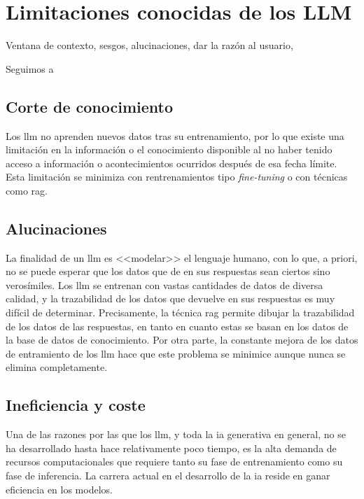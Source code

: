 \section{Limitaciones conocidas de los LLM}
\label{sec:limitaciones_llm}
Ventana de contexto, sesgos, alucinaciones, dar la razón al usuario, 

Seguimos a \cite{arunbijiRAGVsFinetuning}



\subsection{Corte de conocimiento}

Los \gls{llm} no aprenden nuevos datos tras su entrenamiento, por lo que existe una limitación en la información o el conocimiento disponible al no haber tenido acceso a información o acontecimientos ocurridos después de esa fecha límite. Esta limitación se minimiza con rentrenamientos tipo \textit{fine-tuning} o con técnicas como \gls{rag}.

\subsection{Alucinaciones}

La finalidad de un \gls{llm} es <<modelar>> el lenguaje humano, con lo que, a priori, no se puede esperar que los datos que de en sus respuestas sean ciertos sino verosímiles. Los \gls{llm} se entrenan con vastas cantidades de datos de diversa calidad, y la trazabilidad de los datos que devuelve en sus respuestas es muy difícil de determinar. Precisamente, la técnica \gls{rag} permite dibujar la trazabilidad de los datos de las respuestas, en tanto en cuanto estas se basan en los datos de la base de datos de conocimiento. Por otra parte, la constante mejora de los datos de entramiento de los \gls{llm} \citep{gunasekarTextbooksAreAll2023} hace que este problema se minimice aunque nunca se elimina completamente.

\subsection{Ineficiencia y coste}

Una de las razones por las que los \gls{llm}, y toda la \gls{ia} generativa en general, no se ha desarrollado hasta hace relativamente poco tiempo, es la alta demanda de recursos computacionales que requiere tanto su fase de entrenamiento como su fase de inferencia. La carrera actual en el desarrollo de la \gls{ia} reside en ganar eficiencia en los modelos. 


